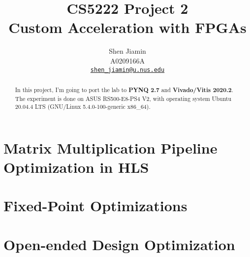 \documentclass{article}
\begin{document}
\title{\bfseries
  CS5222 Project 2 \\
  Custom Acceleration with FPGAs\\
}

\author{
  Shen Jiamin \\
  A0209166A \\
  \href{mailto:shen_jiamin@u.nus.edu}{\nolinkurl{shen_jiamin@u.nus.edu}}
}

\maketitle

\begin{abstract}
  In this project, I'm going to port the lab to \textbf{PYNQ 2.7} and \textbf{Vivado/Vitis 2020.2}.
  The experiment is done on ASUS RS500-E8-PS4 V2, with operating system
  Ubuntu 20.04.4 LTS (GNU/Linux 5.4.0-100-generic x86\_64).
\end{abstract}


\section{Matrix Multiplication Pipeline Optimization in HLS}









\clearpage
\section{Fixed-Point Optimizations}




\clearpage
\section{Open-ended Design Optimization}




% 
% 

\clearpage
\appendix
\end{document}
